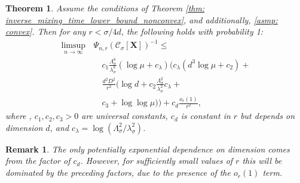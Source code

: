 \documentclass{article}
\newcommand{\1}{\mathbf{1}}
\newcommand{\Xbf}{\mathbf{X}}
\newcommand{\Cset}{\mathcal{C}}
\newcommand{\Csig}{\Cset_{\sigma}}
\theoremstyle{aldenthm}
\newtheorem{theorem}{Theorem}
\theoremstyle{aldenrmrk}
\newtheorem{remark}{Remark}
\begin{document}
\begin{theorem}
\label{thm: inverse_mixing_time_lower_bound}
Assume the conditions of Theorem \ref{thm:
  inverse_mixing_time_lower_bound_nonconvex}, and additionally, \ref{asmp:
  convex}. Then for any $r < \sigma/4d$, the following holds with probability 1:  
\begin{align}
\label{eqn: inverse_mixing_time_lower_bound}
  \limsup_{n \to \infty} \, &\Psi_{n,r}(\Csig[\Xbf])^{-1} \leq \nonumber \\ 
&\quad c_1 \frac{\Lambda_{\sigma}^8}{\lambda_{\sigma}^8} (\log \mu +
  c_{\lambda}) \biggl( c_{\lambda}(d^3 \log\mu + c_2) +{} \nonumber \\  
&\quad \frac{d^2D^2}{r^2} \bigl( \log d + c_2
  \frac{\Lambda_{\sigma}^{2}}{\lambda_{\sigma}^{2}}c_{\lambda} +{} \nonumber \\  
&\quad c_3  + \log \log \mu \bigr) \biggr) + c_d \frac{o_r(1)}{r^2},
\end{align}
where , $c_1,c_2,c_3>0$ are universal
constants, $c_d$ is constant in $r$ but depends on dimension $d$, and
$c_{\lambda} = \log(\Lambda_{\sigma}^2/ \lambda_{\sigma}^2)$.  
\end{theorem}

\begin{remark}
The only potentially exponential dependence on dimension comes from the
factor of $c_d$. However, for sufficiently small values of $r$ this will
be dominated by the preceding factors, due to the presence of the
$o_r(1)$ term. 
\end{remark}
 
\end{document}
